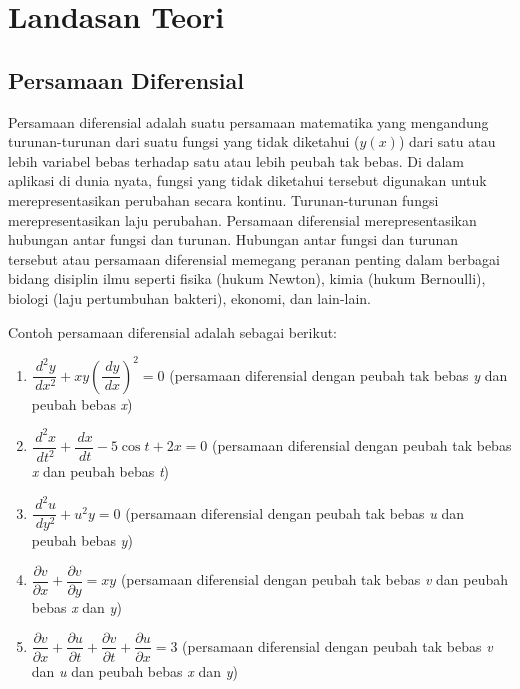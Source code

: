 
\chapter{Landasan Teori}
\label{chap:teori}

\section{Persamaan Diferensial}
\label{sec:PD} 
 
Persamaan diferensial adalah suatu persamaan matematika yang mengandung turunan-turunan dari suatu fungsi yang tidak diketahui (\begin{math} y(x) \end{math}) dari satu atau lebih variabel bebas terhadap satu atau lebih peubah tak bebas. Di dalam aplikasi di dunia nyata,
fungsi yang tidak diketahui tersebut digunakan untuk merepresentasikan perubahan secara kontinu. Turunan-turunan fungsi merepresentasikan laju perubahan. Persamaan diferensial merepresentasikan hubungan antar fungsi dan turunan. Hubungan antar fungsi dan turunan
tersebut atau persamaan diferensial memegang peranan penting dalam berbagai bidang disiplin ilmu seperti fisika (hukum Newton), kimia (hukum Bernoulli), biologi (laju pertumbuhan bakteri), ekonomi, dan lain-lain.

Contoh persamaan diferensial adalah sebagai berikut:

\begin{enumerate}

	\item \begin{math} \dfrac{\, d^{2}y}{\, dx^{2}} + xy(\dfrac{\, dy}{\, dx})^{2} = 0 \end{math} (persamaan diferensial dengan peubah tak bebas \textit{y} dan peubah bebas \textit{x})
	\item \begin{math} \dfrac{\, d^{2}x}{\, dt^{2}} + \dfrac{\, dx}{\, dt} - 5\cos t + 2x = 0 \end{math} (persamaan diferensial dengan peubah tak bebas \textit{x} dan peubah bebas \textit{t})
	\item \begin{math} \dfrac{\, d^{2}u}{\, dy^{2}} + u^{2}y = 0 \end{math} (persamaan diferensial dengan peubah tak bebas \textit{u} dan peubah bebas \textit{y})
	\item \begin{math} \dfrac{\partial v}{\partial x} + \dfrac{\partial v}{\partial y} = xy \end{math} (persamaan diferensial dengan peubah tak bebas \textit{v} dan peubah bebas \textit{x} dan \textit{y})
	\item \begin{math} \dfrac{\partial v}{\partial x} + \dfrac{\partial u}{\partial t} + \dfrac{\partial v}{\partial t} + \dfrac{\partial u}{\partial x}= 3 \end{math} (persamaan diferensial dengan peubah tak bebas \textit{v} dan \textit{u} dan peubah bebas \textit{x} dan 	 \textit{y})
	
\end{enumerate}

